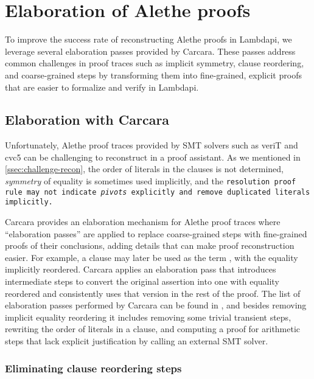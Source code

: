 \chapter{Elaboration of Alethe proofs}\label{ch:elab}

To improve the success rate of reconstructing Alethe proofs in Lambdapi, we leverage several elaboration passes provided by Carcara.
These passes address common challenges in proof traces such as implicit symmetry, clause reordering, and coarse-grained steps by transforming them into fine-grained, explicit proofs that are easier to formalize and verify in Lambdapi.

\section{Elaboration with Carcara}
\label{sect:elaboration}

Unfortunately, Alethe proof traces provided by SMT solvers such as veriT and cvc5 can be challenging to reconstruct in a proof assistant.
As we mentioned in \cref{ssec:challenge-recon}, the order of literals in the clauses is not determined, \emph{symmetry}
of equality is sometimes used implicitly, and the \tt{resolution} proof rule may not indicate \emph{pivots} explicitly and remove duplicated literals implicitly.

Carcara provides an elaboration mechanism \cite[\S 3]{carcara} for Alethe proof traces where ``elaboration passes'' are applied to replace coarse-grained steps with
fine-grained proofs of their conclusions, adding details that can make proof reconstruction easier.
%
For example, a clause  may later be used as the term , with the equality  implicitly reordered.
%
Carcara applies an elaboration pass that introduces intermediate steps to convert the original assertion into one with equality reordered and consistently uses that version in the rest of the proof.
%
The list of elaboration passes performed by Carcara can be found in \cite[\S
3.2]{carcara}, and besides removing implicit equality reordering it includes
removing some trivial transient steps, rewriting the order of literals in a
clause, and computing a proof for arithmetic steps that lack explicit justification by calling an
external SMT solver.

\subsection{Eliminating clause reordering steps}
\label{ssec:elabration-reordering}

